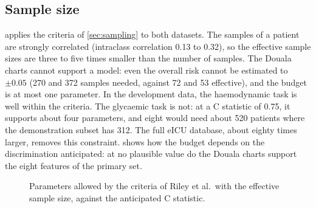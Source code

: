 \documentclass[11pt,a4paper,oneside]{report}
\begin{document}
\subsection{Sample size}\label{sec:results-sample-size}

 applies the criteria of \cref{sec:sampling} to both datasets. The samples of a patient are strongly correlated (intraclass correlation 0.13 to 0.32), so the effective sample sizes are three to five times smaller than the number of samples. The Douala charts cannot support a model: even the overall risk cannot be estimated to $\pm 0.05$ (270 and 372 samples needed, against 72 and 53 effective), and the budget is at most one parameter. In the development data, the haemodynamic task is well within the criteria. The glycaemic task is not: at a C statistic of 0.75, it supports about four parameters, and eight would need about 520 patients where the demonstration subset has 312. The full eICU database, about eighty times larger, removes this constraint.  shows how the budget depends on the discrimination anticipated: at no plausible value do the Douala charts support the eight features of the primary set.

\begin{figure}[htbp]
\centering
{}
\caption{Parameters allowed by the criteria of Riley et al.\ with the effective sample size, against the anticipated C statistic.}\label{fig:riley}
\end{figure}
\end{document}
